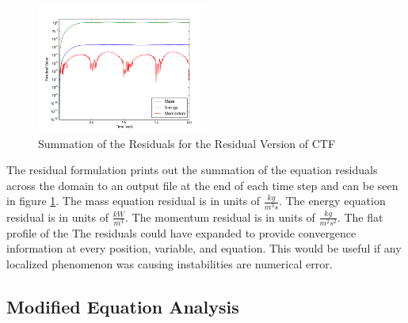 \documentclass{mc2015}
\begin{document}
\begin{figure}[!h]
	\centering
	\includegraphics[width=0.50\textwidth]{images/Code_Verification/run_00_00/residual/results/Residuals_Plot}
	\caption{Summation of the Residuals for the Residual Version of CTF}
	\label{fig:Residuals_Plot}
\end{figure}

The residual formulation prints out the summation of the equation residuals
across the domain to an output file at the end of each time step and can be seen
in figure \ref{fig:Residuals_Plot}. The mass equation residual is in units of
$\frac{kg}{m^{3}s}$. The energy equation residual is in units of
$\frac{kW}{m^{3}}$. The momentum residual is in units of
$\frac{kg}{m^{2}s^{2}}$. The flat profile of the The residuals could have
expanded to provide convergence information at every position, variable, and equation. This would be
useful if any localized phenomenon was causing instabilities are numerical
error.

%
%

\subsection{Modified Equation Analysis}
    
\end{document}
